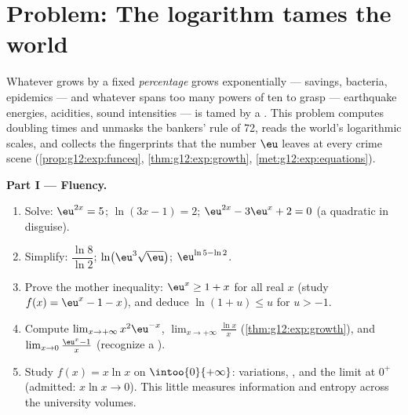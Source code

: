 \section{Problem: The logarithm tames the world}

\begin{problem}
\label{pb:g12:exp:1}
Whatever grows by a fixed \emph{percentage} grows
exponentially --- savings, bacteria, epidemics --- and whatever
spans too many powers of ten to grasp --- earthquake energies,
acidities, sound intensities --- is tamed by a . This
problem computes doubling times and unmasks the bankers' rule of
72, reads the world's logarithmic scales, and collects the
fingerprints that the number $\eu$ leaves at every crime scene
(\cref{prop:g12:exp:funceq}, \cref{thm:g12:exp:growth},
\cref{met:g12:exp:equations}).

\medskip
\noindent\textbf{Part I --- Fluency.}
\begin{enumerate}
  \item Solve: $\eu^{2x} = 5$; \quad $\ln(3x - 1) = 2$; \quad
        $\eu^{2x} - 3\eu^x + 2 = 0$ (a quadratic in disguise).
  \item Simplify: $\dfrac{\ln 8}{\ln 2}$; \quad
        $\ln\!\left(\eu^3 \sqrt{\eu}\right)$; \quad
        $\eu^{\ln 5 - \ln 2}$.
  \item Prove the mother inequality: $\eu^x \geq 1 + x$ for all
        real $x$ (study $f(x) = \eu^x - 1 - x$), and deduce
        $\ln(1 + u) \leq u$ for $u > -1$.
  \item Compute
        $\lim_{x \to +\infty} x^2 \eu^{-x}$,
        $\lim_{x \to +\infty} \frac{\ln x}{x}$
        (\cref{thm:g12:exp:growth}), and
        $\lim_{x \to 0} \frac{\eu^x - 1}{x}$ (recognize a
        ).
  \item Study $f(x) = x \ln x$ on $\intoo{0}{+\infty}$:
        variations, , and the limit at $0^+$ (admitted:
        $x \ln x \to 0$). This little  measures
        information and entropy across the university volumes.
\end{enumerate}


\end{problem}
